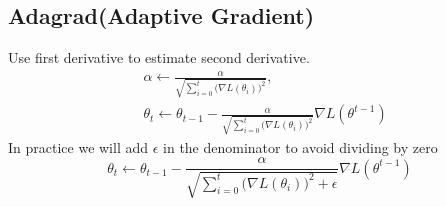 \documentclass[../main.tex]{subfiles}
\begin{document}
        \subsection{Adagrad(Adaptive Gradient)}
            Use first derivative to estimate second derivative.
            \begin{align*}
                & \alpha\leftarrow\frac{\alpha}{\sqrt{\sum_{i=0}^t\big(\nabla L(\theta_i)\big)^2}}, \\
                & \theta_t \leftarrow \theta_{t-1} - \frac{\alpha}{\sqrt{\sum_{i=0}^t\big(\nabla L(\theta_i)\big)^2}}\nabla L(\theta^{t-1}) 
            \end{align*}
            In practice we will add $\epsilon$ in the denominator to avoid dividing by zero
            \[
                \theta_t \leftarrow \theta_{t-1} - \frac{\alpha}{\sqrt{ \sum_{i=0}^t \big( \nabla L(\theta_i) \big)^2 + \epsilon}}\nabla L(\theta^{t-1})        
            \]
\end{document}
